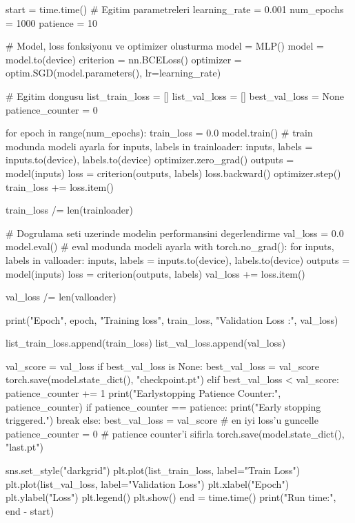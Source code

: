 \documentclass[11pt]{article}
\begin{document}
\begin{python}
start = time.time()
# Egitim parametreleri
learning_rate = 0.001
num_epochs = 1000
patience = 10

# Model, loss fonksiyonu ve optimizer olusturma
model = MLP()
model = model.to(device)
criterion = nn.BCELoss()
optimizer = optim.SGD(model.parameters(), lr=learning_rate)

# Egitim dongusu
list_train_loss = []
list_val_loss = []
best_val_loss = None
patience_counter = 0

for epoch in range(num_epochs):
    train_loss = 0.0
    model.train() # train modunda modeli ayarla
    for inputs, labels in trainloader:
        inputs, labels = inputs.to(device), labels.to(device)
        optimizer.zero_grad()
        outputs = model(inputs)
        loss = criterion(outputs, labels)
        loss.backward()
        optimizer.step()
        train_loss += loss.item()
    
    train_loss /= len(trainloader)
    
    # Dogrulama seti uzerinde modelin performansini degerlendirme
    val_loss = 0.0
    model.eval() # eval modunda modeli ayarla
    with torch.no_grad():
        for inputs, labels in valloader:
            inputs, labels = inputs.to(device), labels.to(device)
            outputs = model(inputs)
            loss = criterion(outputs, labels)
            val_loss += loss.item()
    
    val_loss /= len(valloader)
    
    print("Epoch", epoch, "Training loss", train_loss, "Validation Loss :", val_loss)
    
    list_train_loss.append(train_loss)
    list_val_loss.append(val_loss)
    
    val_score = val_loss
    if best_val_loss is None:
        best_val_loss = val_score
        torch.save(model.state_dict(), "checkpoint.pt")
    elif best_val_loss < val_score:
        patience_counter += 1
        print("Earlystopping Patience Counter:", patience_counter)
        if patience_counter == patience:
            print("Early stopping triggered.")
            break
    else:
        best_val_loss = val_score  # en iyi loss'u guncelle
        patience_counter = 0  # patience counter'i sifirla
torch.save(model.state_dict(), "last.pt")

sns.set_style("darkgrid")
plt.plot(list_train_loss, label="Train Loss")
plt.plot(list_val_loss, label="Validation Loss")
plt.xlabel("Epoch")
plt.ylabel("Loss")
plt.legend()
plt.show()
end = time.time()
print("Run time:", end - start)
\end{python}
\end{document}
